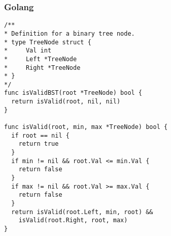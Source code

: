 \subsubsection{Golang}

\begin{verbatim}
/**
* Definition for a binary tree node.
* type TreeNode struct {
*     Val int
*     Left *TreeNode
*     Right *TreeNode
* }
*/
func isValidBST(root *TreeNode) bool {
  return isValid(root, nil, nil)
}

func isValid(root, min, max *TreeNode) bool {
  if root == nil {
    return true
  }
  if min != nil && root.Val <= min.Val {
    return false
  }
  if max != nil && root.Val >= max.Val {
    return false
  }
  return isValid(root.Left, min, root) &&
    isValid(root.Right, root, max)
}
\end{verbatim}
